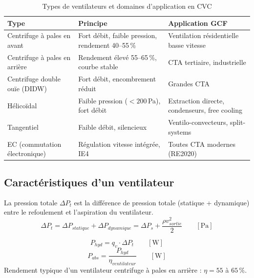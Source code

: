 \begin{table}[H]
  \centering
  \caption{Types de ventilateurs et domaines d'application en CVC}
  \begin{tabular}{p{3cm}p{4.5cm}p{4.5cm}}
    \toprule
    Type & Principe & Application GCF \\
    \midrule
    Centrifuge à pales en avant & Fort débit, faible pression, rendement 40–55\,\% & Ventilation résidentielle basse vitesse \\
    Centrifuge à pales en arrière & Rendement élevé 55–65\,\%, courbe stable & CTA tertiaire, industrielle \\
    Centrifuge double ouïe (DIDW) & Fort débit, encombrement réduit & Grandes CTA \\
    Hélicoïdal & Faible pression ($< 200$\,Pa), fort débit & Extraction directe, condenseurs, free cooling \\
    Tangentiel & Faible débit, silencieux & Ventilo-convecteurs, split-systems \\
    EC (commutation électronique) & Régulation vitesse intégrée, IE4 & Toutes CTA modernes (RE2020) \\
    \bottomrule
  \end{tabular}
\end{table}

\subsection{Caractéristiques d'un ventilateur}

\begin{definition}[title=Pression totale (HMT aéraulique)]
La pression totale $\Delta P_t$ est la différence de pression totale (statique + dynamique) entre le refoulement et l'aspiration du ventilateur.
\begin{equation}
  \Delta P_t = \Delta P_{statique} + \Delta P_{dynamique} = \Delta P_s + \frac{\rho v_{sortie}^2}{2} \qquad \left[\si{\pascal}\right]
\end{equation}
\end{definition}

\begin{definition}[title=Puissance absorbée et rendement]
\begin{equation}
  P_{hyd} = q_v \cdot \Delta P_t \qquad \left[\si{\watt}\right]
\end{equation}
\begin{equation}
  P_{abs} = \frac{P_{hyd}}{\eta_{ventilateur}} \qquad \left[\si{\watt}\right]
\end{equation}
Rendement typique d'un ventilateur centrifuge à pales en arrière : $\eta = 55$ à $65\,\%$.
\end{definition}

